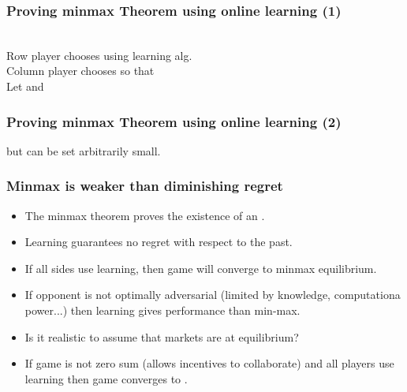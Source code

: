 \documentclass[handout]{beamer}
\begin{document}
\begin{frame}
\frametitle{Proving minmax Theorem using online learning (1)}
~\\
Row player chooses  using learning alg. \\ \pause 
Column player chooses   so that
\R{$\Qt = \arg \maxq \mptq$}
\\ \pause
Let  and
\\ \pause
\R{\em
\[
\begin{array}{rcll}
{\displaystyle{\minp \maxq \trans{\P}\M\Q}} 
 &\leq&
\displaystyle{\maxq \trans{\Pa}\M\Q} & \nextline
\pause
  &=&
\displaystyle{\maxq \frac{1}{T} \sumt \trans{\Pt}\M\Q}
                       &\mbox{\rm by definition of~~\Pa}\nextline
\pause
  &\leq&
\displaystyle{\frac{1}{T} \sumt \maxq \trans{\Pt}\M\Q} &
\end{array}
\]
}
\end{frame}


\begin{frame}
\frametitle{Proving minmax Theorem using online learning (2)}
\R{\em
\[
\begin{array}{rcll}
  &=&
\displaystyle{\frac{1}{T} \sumt \trans{\Pt}\M\Qt}
                       &\mbox{\rm by definition of~~\Qt}\nextline
\pause
  &\leq&
\displaystyle{\minp \frac{1}{T} \sumt \trans{\P}\M\Qt + \delt}
                       &\mbox{\rm by the Corollary} \nextline
\pause
  &=&
\displaystyle{\minp \trans{\P}\M\Qa + \delt}
                       &\mbox{\rm by definition of~~\Qa}\nextline
\pause
  &\leq&
\displaystyle{\maxq \minp \trans{\P}\M\Q + \delt.} &
\end{array}
\]
}
\pause
but \R{$\delt$} can be set arbitrarily small.

\end{frame}

\begin{frame}
\frametitle{Minmax is weaker than diminishing regret}
\begin{itemize}
\item The minmax theorem proves the existence of an .
\item Learning guarantees no regret with respect to the past.
\item If all sides use learning, then game will converge to minmax equilibrium.
\item If opponent is not optimally adversarial (limited by knowledge, computationa power...) then learning gives  performance than min-max.
\item Is it realistic to assume that markets are at equilibrium?
\item If game is not zero sum (allows incentives to collaborate) and all players
use learning then game converges to .
\end{itemize}
\end{frame}
\end{document}
